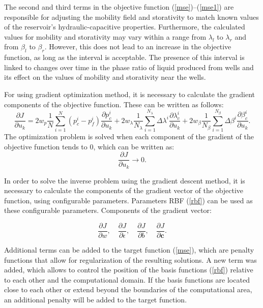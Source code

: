 \documentclass[
11pt,%
tightenlines,%
twoside,%
onecolumn,%
nofloats,%
nobibnotes,%
nofootinbib,%
superscriptaddress,%
noshowpacs,%
centertags]%
{revtex4}
\begin{document}
The second and third terms in the objective function ({\ref{mse}})--({\ref{mse1}}) are responsible for adjusting the mobility field and storativity to match known values of the reservoir's hydraulic-capacitive properties. Furthermore, the calculated values for mobility and storativity may vary within a range from $\lambda_l$ to $\lambda_r$ and from $\beta_l$ to $\beta_r$. However, this does not lead to an increase in the objective function, as long as the interval is acceptable. The presence of this interval is linked to changes over time in the phase ratio of liquid produced from wells and its effect on the values of mobility and storativity near the wells.

For using gradient optimization method, it is necessary to calculate the gradient components of the objective function. These can be written as follows:
\begin{equation*}\label{grad}
	\frac{\partial J}{\partial u_k} = 
	2w_p\frac{1}{N}\sum_{i=1}^N	({p_c^i-p_f^i}) \frac{\partial p_c^i}{\partial u_k}+
	2w_{\lambda}\frac{1}{N_\lambda}\sum_{i=1}^{N_\lambda}{\Delta\lambda^i}\frac{\partial
		\lambda_{c}^i}{\partial u_k}+
	2w_{\beta}\frac{1}{N_\beta}\sum_{i=1}^{N_\beta}{\Delta\beta^i}\frac{\partial
		\beta_{c}^i}{\partial u_k}.
\end{equation*}
The optimization problem is solved when each component of the gradient of the objective function tends to 0, which can be written as:
\begin{equation*} \label{rp}
	\frac{\partial J}{\partial u_k} \rightarrow 0.
\end{equation*}

In order to solve the inverse problem using the gradient descent method, it is necessary to calculate the components of the gradient vector of the objective function, using configurable parameters. Parameters RBF (\ref{rbf}) can be used as these configurable parameters. Components of the gradient vector:

\begin{equation*}
	\frac{\partial J}{\partial w},\quad \frac{\partial J}{\partial \epsilon},\quad \frac{\partial J}{\partial b}, \quad \frac{\partial J}{\partial \mathbf{c}}.
\end{equation*}

Additional terms can be added to the target function (\ref{mse}), which are penalty functions that allow for regularization of the resulting solutions. A new term was added, which allows  to control the position of the basis functions (\ref{rbf}) relative to each other and the computational domain. If the basis functions are located close to each other or extend beyond the boundaries of the computational area, an additional penalty will be added to the target function.
\end{document}
